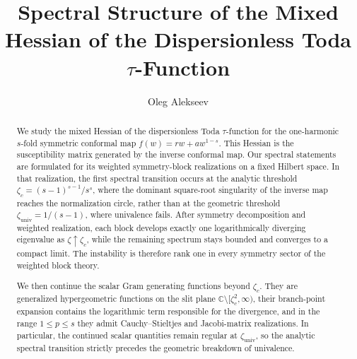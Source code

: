 \documentclass[11pt]{amsart}
\numberwithin{equation}{section}
\theoremstyle{plain}
\theoremstyle{definition}
\theoremstyle{remark}
\begin{document}
\title{Spectral Structure of the Mixed Hessian of the Dispersionless Toda $\tau$-Function}

\author{Oleg Alekseev}%

\address{Department of Mathematics, HSE University (National Research University Higher School of Economics), Moscow, Russia}

\address{Chebyshev Laboratory, Department of Mathematics and Computer Science, Saint Petersburg State University, Saint Petersburg, Russia}



\date{}

\begin{abstract}
We study the mixed Hessian of the dispersionless Toda \(\tau\)-function for
the one-harmonic \(s\)-fold symmetric conformal map
\(f(w)=rw+aw^{1-s}\). This Hessian is the susceptibility matrix generated by
the inverse conformal map. Our spectral statements are formulated for its
weighted symmetry-block realizations on a fixed Hilbert space. In that
realization, the first spectral transition occurs at the analytic threshold
\(\zeta_c=(s-1)^{s-1}/s^s\), where the dominant square-root singularity of the
inverse map reaches the normalization circle, rather than at the geometric
threshold \(\zeta_{\mathrm{univ}}=1/(s-1)\), where univalence fails. After
symmetry decomposition and weighted realization, each block develops exactly
one logarithmically diverging eigenvalue as \(\zeta\uparrow\zeta_c\), while
the remaining spectrum stays bounded and converges to a compact limit. The
instability is therefore rank one in every symmetry sector of the weighted
block theory.

We then continue the scalar Gram generating functions beyond \(\zeta_c\).
They are generalized hypergeometric functions on the slit plane
\(\mathbb{C}\setminus[\zeta_c^2,\infty)\), their branch-point expansion contains
the logarithmic term responsible for the divergence, and in the range
\(1\le p\le s\) they admit Cauchy--Stieltjes and Jacobi-matrix realizations.
In particular, the continued scalar quantities remain regular at
\(\zeta_{\mathrm{univ}}\), so the analytic spectral transition strictly
precedes the geometric breakdown of univalence.
\end{abstract}
\end{document}
